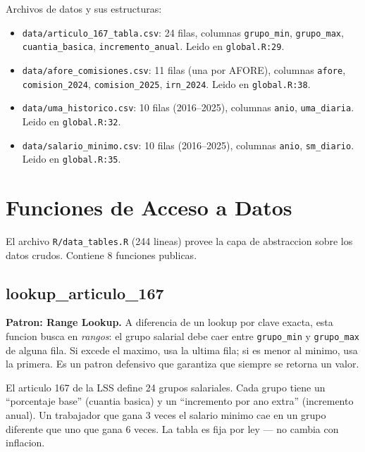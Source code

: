 \documentclass[11pt, letterpaper, twoside]{report}
\begin{document}
\begin{codigobox}
Archivos de datos y sus estructuras:
\begin{itemize}[nosep]
\item \texttt{data/articulo\_167\_tabla.csv}: 24 filas, columnas \texttt{grupo\_min},
      \texttt{grupo\_max}, \texttt{cuantia\_basica}, \texttt{incremento\_anual}.
      Leido en \texttt{global.R:29}.
\item \texttt{data/afore\_comisiones.csv}: 11 filas (una por AFORE), columnas
      \texttt{afore}, \texttt{comision\_2024}, \texttt{comision\_2025}, \texttt{irn\_2024}.
      Leido en \texttt{global.R:38}.
\item \texttt{data/uma\_historico.csv}: 10 filas (2016--2025), columnas \texttt{anio},
      \texttt{uma\_diaria}. Leido en \texttt{global.R:32}.
\item \texttt{data/salario\_minimo.csv}: 10 filas (2016--2025), columnas \texttt{anio},
      \texttt{sm\_diario}. Leido en \texttt{global.R:35}.
\end{itemize}
\end{codigobox}


\section{Funciones de Acceso a Datos}
\label{sec:acceso_datos}

El archivo \texttt{R/data\_tables.R} (244 lineas) provee la capa de abstraccion
sobre los datos crudos. Contiene 8 funciones publicas.

\subsection{lookup\_articulo\_167}

\begin{patronbox}
\textbf{Patron: Range Lookup.} A diferencia de un lookup por clave exacta, esta
funcion busca en \emph{rangos}: el grupo salarial debe caer entre \texttt{grupo\_min}
y \texttt{grupo\_max} de alguna fila. Si excede el maximo, usa la ultima fila;
si es menor al minimo, usa la primera. Es un patron defensivo que garantiza
que siempre se retorna un valor.
\end{patronbox}

\begin{intuicionbox}
El articulo 167 de la LSS define 24 grupos salariales. Cada grupo tiene un
``porcentaje base'' (cuantia basica) y un ``incremento por ano extra'' (incremento anual).
Un trabajador que gana 3 veces el salario minimo cae en un grupo diferente que uno
que gana 6 veces. La tabla es fija por ley --- no cambia con inflacion.
\end{intuicionbox}
\end{document}
